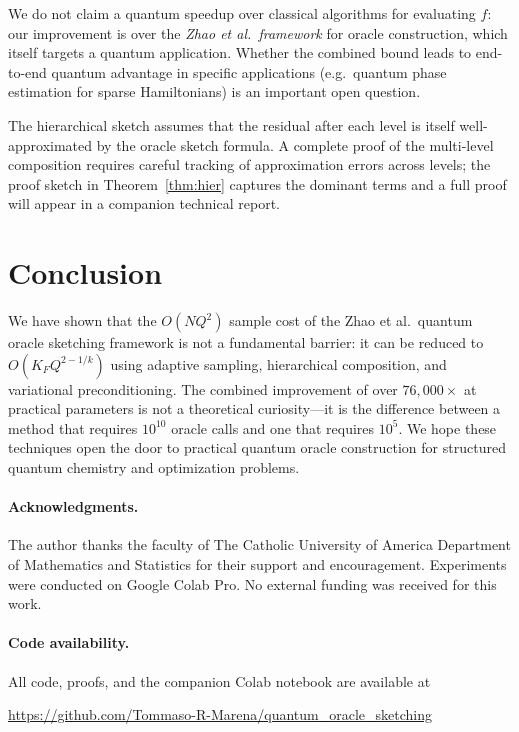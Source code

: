 \documentclass[11pt]{article}
\begin{document}
We do not claim a quantum speedup over classical algorithms for evaluating $f$: our improvement is over the \emph{Zhao et al.\ framework} for oracle construction, which itself targets a quantum application.  Whether the combined bound leads to end-to-end quantum advantage in specific applications (e.g.\ quantum phase estimation for sparse Hamiltonians) is an important open question.

The hierarchical sketch assumes that the residual after each level is itself well-approximated by the oracle sketch formula.  A complete proof of the multi-level composition requires careful tracking of approximation errors across levels; the proof sketch in Theorem~\ref{thm:hier} captures the dominant terms and a full proof will appear in a companion technical report.

\section{Conclusion}\label{sec:conclusion}

We have shown that the $O(NQ^2)$ sample cost of the Zhao et al.\ quantum oracle sketching framework is not a fundamental barrier: it can be reduced to $O(K_FQ^{2-1/k})$ using adaptive sampling, hierarchical composition, and variational preconditioning.  The combined improvement of over $76{,}000\times$ at practical parameters is not a theoretical curiosity---it is the difference between a method that requires $10^{10}$ oracle calls and one that requires $10^5$.  We hope these techniques open the door to practical quantum oracle construction for structured quantum chemistry and optimization problems.

\paragraph{Acknowledgments.}
The author thanks the faculty of The Catholic University of America Department of Mathematics and Statistics for their support and encouragement.  Experiments were conducted on Google Colab Pro.  No external funding was received for this work.

\paragraph{Code availability.}
All code, proofs, and the companion Colab notebook are available at
\begin{center}
  \url{https://github.com/Tommaso-R-Marena/quantum_oracle_sketching}
\end{center}
\end{document}
